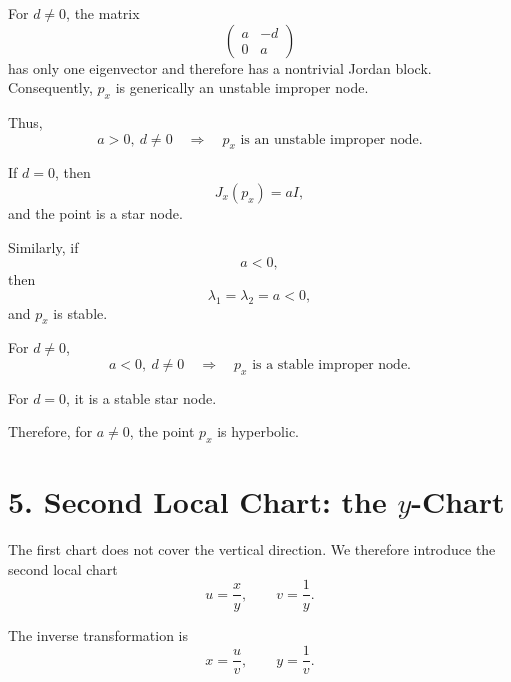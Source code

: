 \documentclass[11pt,a4paper]{article}
\begin{document}
For $d\neq0$, the matrix
\begin{equation}
\begin{pmatrix}
a&-d\\
0&a
\end{pmatrix}
\end{equation}
has only one eigenvector and therefore has a nontrivial Jordan block.
Consequently, $p_x$ is generically an unstable improper node.

Thus,
\begin{equation}
\boxed{
a>0,\ d\neq0
\quad\Longrightarrow\quad
p_x\text{ is an unstable improper node}.
}
\tag{28}
\end{equation}

If $d=0$, then
\begin{equation}
J_x(p_x)=aI,
\end{equation}
and the point is a star node.

Similarly, if
\begin{equation}
a<0,
\end{equation}
then
\begin{equation}
\lambda_1=\lambda_2=a<0,
\end{equation}
and $p_x$ is stable.

For $d\neq0$,
\begin{equation}
\boxed{
a<0,\ d\neq0
\quad\Longrightarrow\quad
p_x\text{ is a stable improper node}.
}
\tag{29}
\end{equation}

For $d=0$, it is a stable star node.

Therefore, for $a\neq0$, the point $p_x$ is hyperbolic.

\section{5. Second Local Chart: the $y$-Chart}

The first chart does not cover the vertical direction. We therefore
introduce the second local chart
\begin{equation}
\boxed{
u=\frac{x}{y},
\qquad
v=\frac1y.
}
\tag{30}
\end{equation}

The inverse transformation is
\begin{equation}
\boxed{
x=\frac{u}{v},
\qquad
y=\frac1v.
}
\tag{31}
\end{equation}
\end{document}
